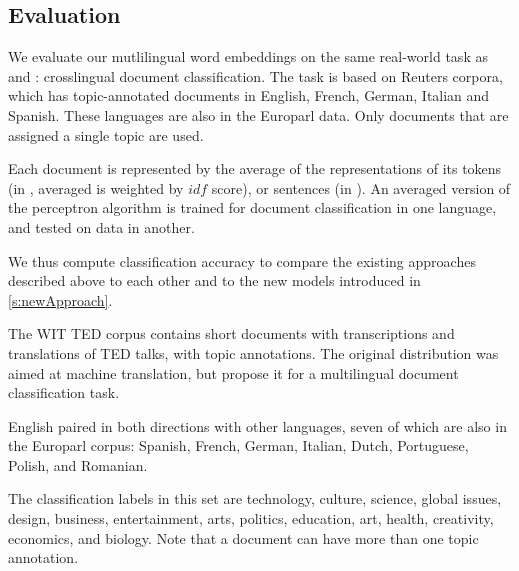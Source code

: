

\subsection{Evaluation}
We evaluate our mutlilingual word embeddings on the same real-world task as \cite{klementiev2012inducing} and \cite{hermann2013multilingual}: crosslingual document classification. The task is based on Reuters corpora, which has topic-annotated documents in English, French, German, Italian and Spanish. These languages are also in the Europarl data. Only documents that are assigned a single topic are used.

Each document is represented by the average of the representations of its tokens (in \cite{klementiev2012inducing}, averaged is weighted by $idf$ score), or sentences (in \cite{hermann2013multilingual}).
An averaged version of the perceptron algorithm is trained for document classification in one language, and tested on data in another.

We thus compute classification accuracy to compare the existing approaches described above to each other and to the new models introduced in \ref{s:newApproach}.






The WIT TED corpus \cite{cettolo2012} contains short documents with transcriptions and translations of TED talks, with topic annotations. The original distribution was aimed at machine translation, but \cite{hermann2014multilingual} propose it for a multilingual document classification task.


English paired in both directions with other languages, seven of which are also in the Europarl corpus: Spanish, French, German, Italian, Dutch, Portuguese, Polish, and Romanian.

The classification labels in this set are technology, culture, science, global issues, design, business, entertainment, arts, politics, education, art, health, creativity, economics, and biology. Note that a document can have more than one topic annotation. 







